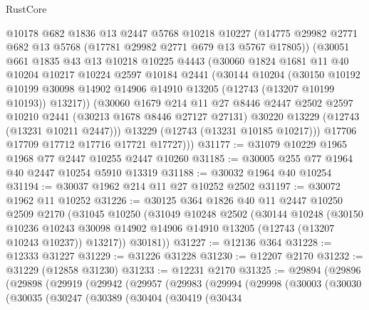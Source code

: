 \begin{lexlean}{RustCore}
\begin{coremodule}
        @10178
        @682
        @1836
        @13
        @2447
        @5768
        @10218
        @10227
        (@14775 @29982 @2771 @682 @13 @5768 (@17781 @29982 @2771 @679 @13 @5767 @17805))
        (@30051
          @661
          @1835
          @43
          @13
          @10218
          @10225
          @4443
          (@30060
            @1824
            @1681
            @11
            @40
            @10204
            @10217
            @10224
            @2597
            @10184
            @2441
            (@30144
              @10204
              (@30150
                @10192
                @10199
                @30098
                @14902
                @14906
                @14910
                @13205
                (@12743 (@13207 @10199 @10193))
                @13217))
            (@30060
              @1679
              @214
              @11
              @27
              @8446
              @2447
              @2502
              @2597
              @10210
              @2441
              (@30213 @1678 @8446 @27127 @27131)
              @30220
              @13229
              (@12743 (@13231 @10211 @2447)))
            @13229
            (@12743 (@13231 @10185 @10217)))
          @17706
          @17709
          @17712
          @17716
          @17721
          @17727)))
@31177 := @31079 @10229 @1965 @1968 @77 @2447 @10255 @2447 @10260
@31185 := @30005 @255 @77 @1964 @40 @2447 @10254 @5910 @13319
@31188 := @30032 @1964 @40 @10254
@31194 := @30037 @1962 @214 @11 @27 @10252 @2502
@31197 := @30072 @1962 @11 @10252
@31226 := @30125
    @364
    @1826
    @40
    @11
    @2447
    @10250
    @2509
    @2170
    (@31045
      @10250
      (@31049
        @10248
        @2502
        (@30144
          @10248
          (@30150
            @10236
            @10243
            @30098
            @14902
            @14906
            @14910
            @13205
            (@12743 (@13207 @10243 @10237))
            @13217))
        @30181))
@31227 := @12136 @364
@31228 := @12333 @31227
@31229 := @31226 @31228
@31230 := @12207 @2170
@31232 := @31229 (@12858 @31230)
@31233 := @12231 @2170
@31325 := @29894
    (@29896
      (@29898
        (@29919
          (@29942
            (@29957
              (@29983
                (@29994
                  (@29998
                    (@30003
                      (@30030
                        (@30035
                          (@30247
                            (@30389
                              (@30404
                                (@30419
                                  (@30434

\end{coremodule}
\end{lexlean}

